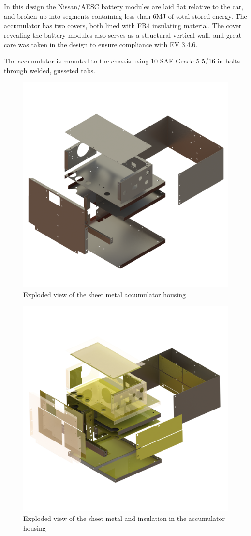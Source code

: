 \documentclass{article}
\begin{document}
            In this design the Nissan/AESC battery modules are laid flat relative to the car, and broken up into segments containing less than 6MJ of total stored energy. The accumulator has two covers, both lined with FR4 insulating material. The cover revealing the battery modules also serves as a structural vertical wall, and great care was taken in the design to ensure compliance with EV 3.4.6.

            The accumulator is mounted to the chassis using 10 SAE Grade 5 5/16 in bolts through welded, gusseted tabs.


            \begin{figure}[H]
                \centering
                \includegraphics[width = 0.5 \textwidth]{sheetmetal_isoview}
                \caption{Exploded view of the sheet metal accumulator housing}
                \label{cellcut}
            \end{figure}

            \begin{figure}[H]
                \centering
                \includegraphics[width = 0.5 \textwidth]{accumulator_insulation_frame_isoview}
                \caption{Exploded view of the sheet metal and insulation in the accumulator housing}
                \label{cellexp}
            \end{figure}
\end{document}
